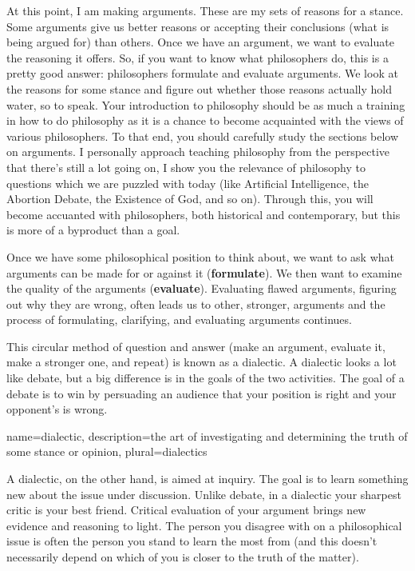 At this point, I am making \glspl{argument}. These are my sets of reasons for a stance. Some arguments give us better reasons or accepting their \glspl{conclusion} (what is being argued for) than others. Once we have an argument, we want to evaluate the reasoning it offers. So, if you want to know what philosophers do, this is a pretty good answer: philosophers formulate and evaluate arguments. We look at the reasons for some stance and figure out whether those reasons actually hold water, so to speak.  Your introduction to philosophy should be as much a training in how to do philosophy as it is a chance to become acquainted with the views of various philosophers. To that end, you should carefully study the sections below on arguments. I personally approach teaching philosophy from the perspective that there's still a lot going on, I show you the relevance of philosophy to questions which we are puzzled with today (like Artificial Intelligence, the Abortion Debate, the Existence of God, and so on). Through this, you will become accuanted with philosophers, both historical and contemporary, but this is more of a byproduct than a goal.

Once we have some philosophical position to think about, we want to ask what arguments can be made for or against it (\textbf{formulate}). We then want to examine the quality of the arguments (\textbf{evaluate}). Evaluating flawed arguments, figuring out why they are wrong, often leads us to other, stronger, arguments and the process of formulating, clarifying, and evaluating arguments continues.

This circular method of question and answer (make an argument, evaluate it, make a stronger one, and repeat) is known as a \gls{dialectic}. A dialectic looks a lot like debate, but a big difference is in the goals of the two activities. The goal of a debate is to win by persuading an audience that your position is right and your opponent’s is wrong.

{
name=dialectic,
description={the art of investigating and determining the truth of some stance or opinion},
plural=dialectics
}


A dialectic, on the other hand, is aimed at inquiry. The goal is to learn something new about the issue under discussion. Unlike debate, in a dialectic your sharpest critic is your best friend. Critical evaluation of your argument brings new evidence and reasoning to light. The person you disagree with on a philosophical issue is often the person you stand to learn the most from (and this doesn’t necessarily depend on which of you is closer to the truth of the matter).

